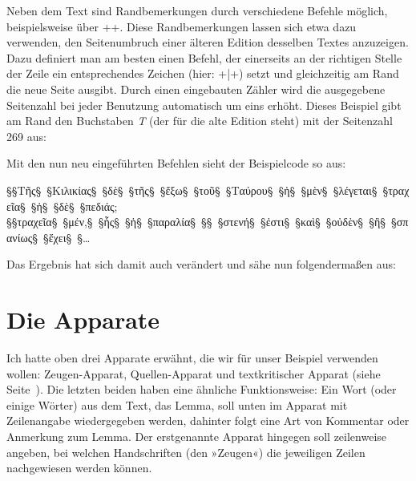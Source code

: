 Neben dem Text sind Randbemerkungen durch verschiedene Befehle möglich, beispielsweise über ++. 
Diese Randbemerkungen lassen sich etwa dazu verwenden, den Seitenumbruch einer älteren Edition desselben Textes anzuzeigen. Dazu definiert man am besten einen Befehl, der einerseits an der richtigen Stelle der Zeile ein entsprechendes Zeichen 
(hier: +|+) setzt und gleichzeitig am Rand die neue Seite ausgibt.
Durch einen eingebauten Zähler wird die ausgegebene Seitenzahl bei jeder Benutzung automatisch um eins erhöht.
Dieses Beispiel gibt am Rand den Buchstaben \emph{T} (der für die alte Edition steht) mit der Seitenzahl 269 aus:

\begin{lfgwcode}{}
\setcounter{alteSeite}{269}
\newcommand\alteSeite{{|\ledsidenote{\emph{T}~\thealteSeite\stepcounter{alteSeite}}}}
\end{lfgwcode}

Mit den nun neu eingeführten Befehlen sieht der Beispielcode so aus:

\begin{lfgwcode}{}
\beginnumbering
{}
§\null§Τῆς§~§Κιλικίας§~§δὲ§~§τῆς§~§ἔξω§~§τοῦ§~§Ταύρου§~§ἡ§~§μὲν§~§λέγεται§~§τραχεῖα§~§ἡ§~§δὲ§~§πεδιάς;
§\null§τραχεῖα§~§μέν,§~§ἧς§~§ἡ§~§παραλία§~§\alteSeite{}§~§στενή§~§ἐστι§~§καὶ§~§οὐδὲν§~§ἢ§~§σπανίως§~§ἔχει§~§\dots{}
\pend
\endnumbering
\end{lfgwcode}

Das Ergebnis hat sich damit auch verändert und sähe nun folgendermaßen aus:

\begin{reledmacbsp}{\bsplineenum}
\end{reledmacbsp}

\label{apparate-grundlagen-ende}


\section{Die Apparate}

Ich hatte oben drei Apparate erwähnt, die wir für unser Beispiel verwenden wollen: 
Zeugen-Apparat, Quellen-Apparat und textkritischer Apparat (siehe Seite~\pageref{pil:apparat}). 
Die letzten beiden haben eine ähnliche Funktionsweise: 
Ein Wort (oder einige Wörter) aus dem Text, das Lemma, soll unten im Apparat mit Zeilenangabe wiedergegeben werden, dahinter folgt eine Art von Kommentar oder Anmerkung 
zum Lemma. Der erstgenannte Apparat hingegen soll zeilenweise angeben, 
bei welchen Handschriften (den »Zeugen«) die jeweiligen Zeilen nachgewiesen werden können.


